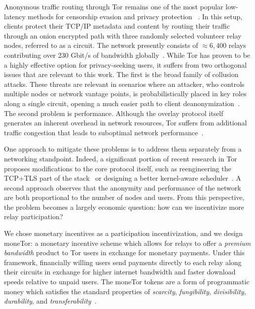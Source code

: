 Anonymous traffic routing through Tor remains one of the most popular
low-latency methods for censorship evasion and privacy protection
~\cite{dingledine2004tor}. In this setup, clients protect their TCP/IP metadata
and content by routing their traffic through an onion encrypted path with three
randomly selected volunteer relay nodes, referred to as a circuit. The network
presently consists of $\approx 6,400$ relays contributing over 230 Gbit/s of
bandwidth globally~\cite{portal2018tormetrics}. While Tor has proven to be a
highly effective option for privacy-seeking users, it suffers from two
orthogonal issues that are relevant to this work. The first is the broad family
of collusion attacks. These threats are relevant in scenarios where an attacker,
who controls multiple nodes or network vantage points, is probabilistically
placed in key roles along a single circuit, opening a much easier path to client
deanonymization~\cite{wright2004predecessor,murdoch2005low}. The second problem
is performance. Although the overlay protocol itself generates an inherent
overhead in network resources, Tor suffers from additional traffic congestion
that leads to suboptimal network performance~\cite{portal2018tormetrics,
  alsabah2016performance}.

One approach to mitigate these problems is to address them separately from a
networking standpoint. Indeed, a significant portion of recent research in Tor
proposes modifications to the core protocol itself, such as reengineering the
TCP+TLS part of the stack~\cite{reardon2009improving} or designing a better
kernel-aware scheduler~\cite{jansen2014never}. A second approach observes that
the anonymity and performance of the network are both proportional to the number
of nodes and users. From this perspective, the problem becomes a largely
economic question: how can we incentivize more relay participation? 

We chose monetary incentives as a participation incentivization, and we design moneTor: a monetary incentive scheme which allows for relays to offer a \emph{premium bandwidth} product
to Tor users in exchange for monetary payments. Under this framework,
financially willing users send payments directly to each relay along their circuits
in exchange for higher internet bandwidth and faster download speeds relative to
unpaid users. %
The moneTor tokens %
are a form of programmatic money which satisfies the standard properties of
\textit{scarcity}, \textit{fungibility}, \textit{divisibility},
\textit{durability}, and
\textit{transferability}~\cite[p.3]{crump2011phenomenon}.

